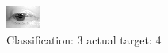 \begin{figure}[h!]
\begin{center}
\includegraphics[width=0.60\columnwidth]{figures/ID2560_class_3_target_4.png}
\end{center}
\caption{ Classification: 3 actual target: 4}
\label{fig:ID2560_class_3_target_4}
\end{figure}
